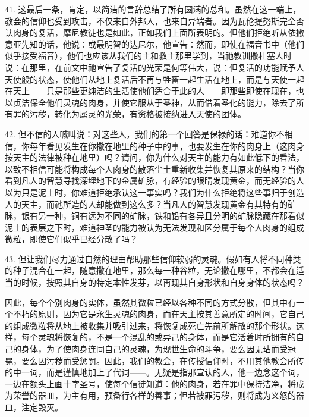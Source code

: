 41. 这最后一条，肯定，以简洁的言辞总结了所有圆满的总和。虽然在这一端上，教会的信仰也受到攻击，不仅来自外邦人，也来自异端者。因为瓦伦提努斯完全否认肉身的复活，摩尼教徒也是如此，正如我们上面所表明的。但他们拒绝听从依撒意亚先知的话，他说：或最明智的达尼尔，他宣告：然而，即使在福音书中（他们似乎接受福音），他们也应该从我们的主和救主那里学到，当祂教训撒杜塞人时说：在那里，在前文中祂宣告了复活的光荣是何等伟大，说：但复活的功能赋予人天使般的状态，使他们从地上复活后不再与牲畜一起生活在地上，而是与天使一起在天上——只是那些更纯洁的生活使他们适合于此的人——即那些即使在现在，也以贞洁保全他们灵魂的肉身，并使它服从于圣神，从而借着圣化的能力，除去了所有罪的污秽，转化为属灵的光荣，有资格被接纳进入天使的团体。\par

42. 但不信的人喊叫说：对这些人，我们的第一个回答是保禄的话：难道你不相信，你每年看见发生在你撒在地里的种子中的事，也要发生在你的肉身上（这肉身按天主的法律被种在地里）吗？请问，你为什么对天主的能力有如此低下的看法，以致不相信可能将构成每个人肉身的散落尘土重新收集并恢复其原来的结构？当你看到凡人的智慧寻找深埋地下的金属矿脉，有经验的眼睛发现黄金，而无经验的人以为只是泥土时，你难道拒绝承认这一事实吗？我们为什么拒绝将这些事归于创造人的天主，而祂所造的人却能做到这么多？当凡人的智慧发现黄金有其特有的矿脉，银有另一种，铜有远为不同的矿脉，铁和铅有各异且分明的矿脉隐藏在那看似泥土的表层之下时，难道神圣的能力被认为无法发现和区分属于每个人肉身的组成微粒，即使它们似乎已经分散了吗？\par

43. 但让我们尽力通过自然的理由帮助那些信仰软弱的灵魂。假如有人将不同种类的种子混合在一起，随意撒在地里，那么每一种谷粒，无论撒在哪里，不都会在适当的时候，按照其自身的特定本性发芽，以再现其自身形状和自身身体的状态吗？\par

因此，每个个别肉身的实体，虽然其微粒已经以各种不同的方式分散，但其中有一个不朽的原则，因为它是永生灵魂的肉身，而在天主按其善意所定的时间，它自己的组成微粒将从地上被收集并吸引过来，将恢复成死亡先前所解散的那个形状。这样，每个灵魂将恢复的，不是一个混乱的或异己的身体，而是它活着时所拥有的自己的身体，为了使肉身连同自己的灵魂，为现世生命的斗争，要么因无玷而受冠冕，要么因污秽而受惩罚。因此，我们的教会，在传授信仰时，不用其他教会所传的中一词，而是谨慎地加上了代词——。无疑是指那宣认的人，他一边念这个词，一边在额头上画十字圣号，使每个信徒知道：他的肉身，若在罪中保持洁净，将成为荣誉的器皿，为主有用，预备行各样的善事；但若被罪污秽，则将成为义怒的器皿，注定毁灭。\par

